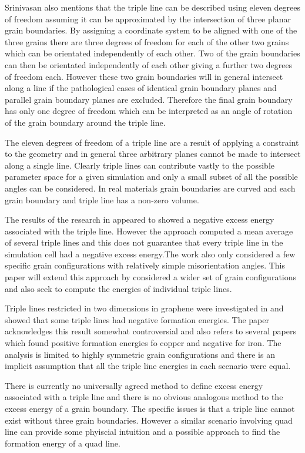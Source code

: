 \documentclass[12pt,a4paper]{book}
\begin{document}
Srinivasan also mentions that the triple line can be described using eleven degrees of freedom assuming it can be approximated by the intersection of three planar grain boundaries. By assigning a coordinate system to be aligned with one of the three grains there are three degrees of freedom for each of the other two grains which can be orientated independently of each other. Two of the grain boundaries can then be orientated independently of each other giving a further two degrees of freedom each. However these two grain boundaries will in general intersect along a line if the pathological cases of identical grain boundary planes and parallel grain boundary planes are excluded. Therefore the final grain boundary has only one degree of freedom which can be interpreted as an angle of rotation of the grain boundary around the triple line.

The eleven degrees of freedom of a triple line are a result of applying a constraint to the geometry and in general three arbitrary planes cannot be made to intersect along a single line. Clearly triple lines can contribute vastly to the possible parameter space for a given simulation and only a small subset of all the possible angles can be considered. In real materials grain boundaries are curved and each grain boundary and triple line has a non-zero volume.

The results of the research in \citep{Srinivasan1999} appeared to showed a negative excess energy associated with the triple line. However the approach computed a mean average of several triple lines and this does not guarantee that every triple line in the simulation cell had a negative excess energy.The work also only considered a few specific grain configurations with relatively simple misorientation angles. This paper will extend this approach by considered a wider set of grain configurations and also seek to compute the energies of individual triple lines.

Triple lines restricted in two dimensions in graphene were  investigated in \citep{Hirvonen2017} and showed that some triple lines had negative formation energies. The paper acknowledges this result somewhat controversial and also refers to several papers which found positive formation energies fo copper and negative for iron. The analysis is limited to highly symmetric grain configurations and there is an implicit assumption that all the triple line energies in each scenario were equal.
 

There is currently no universally agreed method to define excess energy associated with a triple line and there is no obvious analogous method to the excess energy of a grain boundary. The specific issues is that a triple line cannot exist without three grain boundaries. However a similar scenario involving quad line can provide some phyiscial intuition and a possible approach to find the formation energy of a quad line. 
\end{document}
